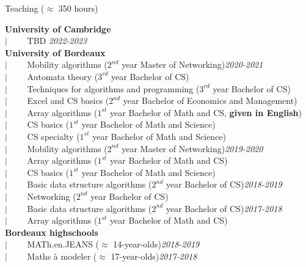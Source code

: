 \documentclass[french]{resume} %
\begin{document}
	\begin{rSection}{Teaching ($\approx$ 350 hours)}
		
		\textbf{University of Cambridge}\\
		$| \qquad$ TBD \hfill {\em 2022-2023}
		\\
		
		\textbf{University of Bordeaux} \\
		$| \qquad$ Mobility algorithms ($2^{nd}$ year Master of Networking)\hfill {\em 2020-2021}\\
		$| \qquad$ Automata theory ($3^{rd}$ year Bachelor of CS)\\
		$| \qquad$ Techniques for algorithms and programming ($3^{rd}$ year Bachelor of CS)\\
		$| \qquad$ Excel and CS basics ($2^{nd}$ year Bachelor of Economics and Management)\\
		$| \qquad$ Array algorithms ($1^{st}$ year Bachelor of Math and CS, \textbf{given in English})\\
		$| \qquad$ CS basics ($1^{st}$ year Bachelor of Math and Science)\\
		$| \qquad$ CS specialty ($1^{st}$ year Bachelor of Math and Science)\\
		$| \qquad$ Mobility algorithms ($2^{nd}$ year Master of Networking)\hfill {\em 2019-2020}\\
		$| \qquad$ Array algorithms ($1^{st}$ year Bachelor of Math and CS)\\
		$| \qquad$ CS basics ($1^{st}$ year Bachelor of Math and Science)\\
		$| \qquad$ Basic data structure algorithms ($2^{nd}$ year Bachelor of CS)\hfill {\em 2018-2019}\\
		$| \qquad$ Networking ($2^{nd}$ year Bachelor of CS)\\
		$| \qquad$ Basic data structure algorithms ($2^{nd}$ year Bachelor of CS)\hfill {\em 2017-2018}\\
		$| \qquad$ Array algorithms ($1^{st}$ year Bachelor of Math and CS)
		\\
		
		\textbf{Bordeaux highschools} \\
		$| \qquad$ MATh.en.JEANS ($\approx$ 14-year-olds)\hfill {\em 2018-2019}\\
		$| \qquad$ Maths à modeler ($\approx$ 17-year-olds)\hfill {\em 2017-2018}
	\end{rSection}
	
\end{document}

